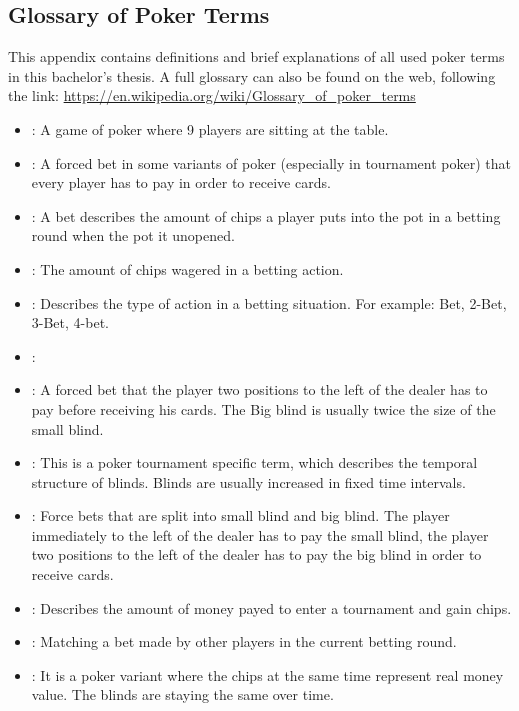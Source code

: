 \begin{appendices}
\chapter{Glossary of Poker Terms}
This appendix contains definitions and brief explanations of all used poker terms in this bachelor's thesis. A full glossary can also be found on the web, following the link: \href{https://en.wikipedia.org/wiki/Glossary_of_poker_terms}{https://en.wikipedia.org/wiki/Glossary\_of\_poker\_terms}
\begin{itemize}
\item {}:
A game of poker where 9 players are sitting at the table.
\item {}:
A forced bet in some variants of poker (especially in tournament poker) that every player has to pay in order to receive cards.
\item {}:
A bet describes the amount of chips a player puts into the pot in a betting round when the pot it unopened.
\item {}:
The amount of chips wagered in a betting action.
\item {}:
Describes the type of action in a betting situation. For example: Bet, 2-Bet, 3-Bet, 4-bet.
\item {}:
\item {}:
A forced bet that the player two positions to the left of the dealer has to pay before receiving his cards. The Big blind is usually twice the size of the small blind.
\item {}:
This is a poker tournament specific term, which describes the temporal structure of blinds. Blinds are usually increased in fixed time intervals.
\item {}:
Force bets that are split into small blind and big blind. The player immediately to the left of the dealer has to pay the small blind, the player two positions to the left of the dealer has to pay the big blind in order to receive cards.
\item {}:
Describes the amount of money payed to enter a tournament and gain chips.
\item {}:
Matching a bet made by other players in the current betting round.
\item {}: It is a poker variant where the chips at the same time represent real money value. The blinds are staying the same over time.

\end{itemize}
\end{appendices}
